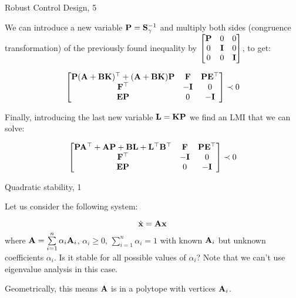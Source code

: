 \documentclass{beamer}
\begin{document}
\begin{frame}{Robust Control Design, 5}
	\begin{flushleft}
		
		We can introduce a new variable $\mathbf{P} = \mathbf{S}^{-1}_\gamma$ and multiply both sides (congruence transformation) of the previously found inequality by $\begin{bmatrix}
			\mathbf{P} & 0 & 0 \\
			0 & \mathbf{I} & 0 \\
			0 & 0 & \mathbf{I}
		\end{bmatrix}$, to get:
		
		\begin{equation}
			\begin{bmatrix}
				\mathbf{P}(\mathbf{A} + \mathbf{B}\mathbf{K})^\top + (\mathbf{A} + \mathbf{B}\mathbf{K})\mathbf{P} & \mathbf{F} & \mathbf{P}\mathbf{E}^\top \\
				\mathbf{F}^\top & -\mathbf{I} & 0 \\
				\mathbf{E}\mathbf{P} & 0 & -\mathbf{I}
			\end{bmatrix} 
			\prec 0
		\end{equation}	
		
		Finally, introducing the last new variable $\mathbf{L} = \mathbf{K}\mathbf{P}$ we find an LMI that we can solve:
		
		\begin{equation}
			\begin{bmatrix}
				\mathbf{P}\mathbf{A}^\top + \mathbf{A}\mathbf{P} + \mathbf{B}\mathbf{L} + \mathbf{L}^\top \mathbf{B}^\top & \mathbf{F} & \mathbf{P}\mathbf{E}^\top \\
				\mathbf{F}^\top & -\mathbf{I} & 0 \\
				\mathbf{E}\mathbf{P} & 0 & -\mathbf{I}
			\end{bmatrix} 
			\prec 0
		\end{equation}
		
		
	\end{flushleft}
\end{frame}







\begin{frame}{Quadratic stability, 1}
	\begin{flushleft}
		
		Let us consider the following system:
		
		\begin{equation}
			\dot{\mathbf{x}} = \mathbf{A}\mathbf{x}
		\end{equation}
		where $\mathbf{A} = \sum\limits_{i=1}^{n} \alpha_i \mathbf{A}_i$, $\alpha_i \geq 0$, $\sum\limits_{i=1}^{n} \alpha_i = 1$ with known $\mathbf{A}_i$ but unknown coefficients $\alpha_i$. Is it stable for all possible values of $\alpha_i$? Note that we can't use eigenvalue analysis in this case.
		
		\bigskip
		
		Geometrically, this means $\mathbf{A}$ is in a polytope with vertices $\mathbf{A}_i$.
		
	\end{flushleft}
\end{frame}
\end{document}
